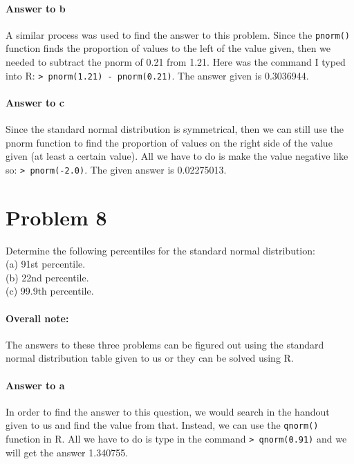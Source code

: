 \documentclass{article}
\begin{document}
	\paragraph{Answer to b}
	A similar process was used to find the answer to this problem. Since the \texttt{pnorm()} 
	function finds the proportion of values to the left of the value given, then we needed to subtract 
	the pnorm of 0.21 from 1.21. Here was the command I typed into R: \texttt{> pnorm(1.21) - 
	pnorm(0.21)}. The answer given is 0.3036944.
	
	\paragraph{Answer to c}
	Since the standard normal distribution is symmetrical, then we can still use the pnorm function 
	to find the proportion of values on the right side of the value given (at least a certain value). All 
	we have to do is make the value negative like so: \texttt{> pnorm(-2.0)}. The given answer is 
	0.02275013.
	
\clearpage
\section*{Problem 8}

	Determine the following percentiles for the standard normal distribution: \\
	
	\noindent (a) 91st percentile. \\
	(b) 22nd percentile. \\
	(c) 99.9th percentile.
	
	\paragraph{Overall note:}
	The answers to these three problems can be figured out using the standard normal distribution 
	table given to us or they can be solved using R.
	
	\paragraph{Answer to a}
	In order to find the answer to this question, we would search in the handout given to us and find 
	the value from that. Instead, we can use the \texttt{qnorm()} function in R. All we have to do is 
	type in the command \texttt{> qnorm(0.91)} and we will get the answer 1.340755.
	
\end{document}
